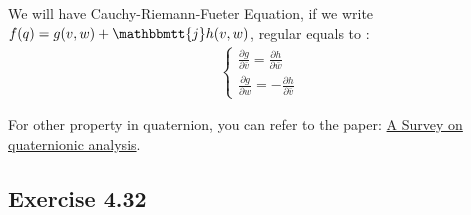 \documentclass[]{ctexart}
\newcommand{\mi}{\mathbbmtt{i}}
\newcommand{\mj}{\mathbbmtt{j}}
\newcommand{\pa}{\partial}
\newcommand{\me}{\mathrm{e}}
\begin{document}
		We will have Cauchy-Riemann-Fueter Equation, if we write $f(q)=g(v,w)+\mj h(v,w)$,  regular equals to :
			\begin{equation*}
			\begin{aligned}
				\begin{cases}
					\frac{\pa g}{\pa \bar{v}}=\frac{\pa h}{\pa \bar{w}}\\
					\frac{\pa g}{\pa w}=-\frac{\pa h}{\pa \bar{v}}
				\end{cases}
			\end{aligned}
			\end{equation*}
		
		For other property in quaternion, you can refer to the paper: \href{https://pdfs.semanticscholar.org/8988/92629ed7a9e1de8e1775641d76f4977c37ef.pdf?_ga=2.211757782.2104940488.1587127236-1682194610.1583117366}{A Survey on quaternionic analysis}.
		
	\subsection{Exercise 4.32}
%		
		
\end{document}
